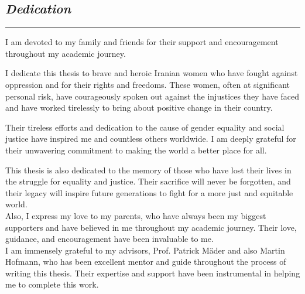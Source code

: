 \thispagestyle{empty}

\begin{center}
    \subsection*{\centering\textit{Dedication}}

    \rule{\linewidth}{0.5pt}

    {\selectfont
        I am devoted to my family and friends for their support and encouragement throughout my academic journey.

        I dedicate this thesis to brave and heroic Iranian women who have fought against oppression and for their rights and freedoms. These women, often at significant personal risk, have courageously spoken out against the injustices they have faced and have worked tirelessly to bring about positive change in their country.

        Their tireless efforts and dedication to the cause of gender equality and social justice have inspired me and countless others worldwide. I am deeply grateful for their unwavering commitment to making the world a better place for all.

        This thesis is also dedicated to the memory of those who have lost their lives in the struggle for equality and justice. Their sacrifice will never be forgotten, and their legacy will inspire future generations to fight for a more just and equitable world.
        \\\vspace{1cm}
        Also, I express my love to my parents, who have always been my biggest supporters and have believed in me throughout my academic journey. Their love, guidance, and encouragement have been invaluable to me.
        \\\vspace{1cm}
        I am immensely grateful to my advisors, Prof. Patrick Mäder and also Martin Hofmann, who has been excellent mentor and guide throughout the process of writing this thesis. Their expertise and support have been instrumental in helping me to complete this work.
    }

\end{center}
\normalfont

\newpage